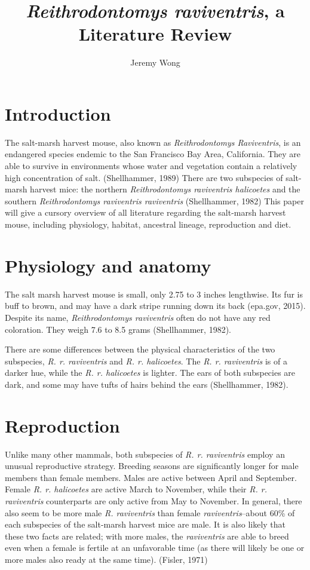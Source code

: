 \documentclass[a4paper]{article}
\author{Jeremy Wong}
\title{\textit{Reithrodontomys raviventris}, a Literature Review}
\begin{document}
\maketitle
\section{Introduction}
The salt-marsh harvest mouse, also known as \textit{Reithrodontomys Raviventris}, is an endangered species endemic to the San Francisco Bay Area, California. They are able to survive in environments whose water and vegetation contain a relatively high concentration of salt. (Shellhammer, 1989)
There are two subspecies of salt-marsh harvest mice: the northern \textit{Reithrodontomys raviventris halicoetes} and the southern \textit{Reithrodontomys raviventris raviventris} (Shellhammer, 1982) This paper will give a cursory overview of all literature regarding the salt-marsh harvest mouse, including physiology, habitat, ancestral lineage, reproduction and diet. 
\section{Physiology and anatomy} The salt marsh harvest mouse is small, only 2.75 to 3 inches lengthwise. Its fur is buff to brown, and may have a dark stripe running down its back (epa.gov, 2015). Despite its name, \textit{Reithrodontomys raviventris} often do not have any red coloration. They weigh 7.6 to 8.5 grams (Shellhammer, 1982).

There are some differences between the physical characteristics of the two subspecies, \textit{R. r. raviventris} and \textit{R. r. halicoetes}. The \textit{R. r. raviventris} is of a darker hue, while the \textit{R. r. halicoetes} is lighter. The ears of both subspecies are dark, and some may have tufts of hairs behind the ears (Shellhammer, 1982).

\section{Reproduction}
Unlike many other mammals, both subspecies of \textit{R. r. raviventris} employ an unusual reproductive strategy. Breeding seasons are significantly longer for male members than female members. Males are active between April and September. Female \textit{R. r. halicoetes} are active March to November, while their \textit{R. r. raviventris} counterparts are only active from May to November. In general, there also seem to be more male \textit{R. raviventris} than female \textit{raviventris}--about 60\% of each subspecies of the salt-marsh harvest mice are male. It is also likely that these two facts are related; with more males, the \textit{raviventris} are able to breed even when a female is fertile at an unfavorable time (as there will likely be one or more males also ready at the same time). (Fisler, 1971)
\end{document}
